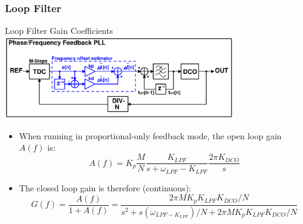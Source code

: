 \documentclass[t, screen, aspectratio=43]{beamer}
\begin{document}
\begin{frame}
	\frametitle{Loop Filter}
	\begin{block}{Loop Filter Gain Coefficients}
		\vspace{-0.5em}
		\center\includegraphics[width=0.75\textwidth, angle=0]{more_advanced.pdf}
		\begin{itemize}
			\footnotesize
			\item When running in proportional-only feedback mode, the open loop gain $A(f)$ is:
			\tiny
			\begin{equation}
				A(f) = K_p \frac{M}{N}\frac{K_{LPF}}{s + \omega_{LPF} - K_{LPF}}\frac{2\pi K_{DCO}}{s}
			\end{equation}
			\footnotesize
			\item The closed loop gain is therefore (continuous):
			\tiny
			\begin{equation}
				G(f) =  \frac{A(f)}{1+A(f)}= \frac{2\pi M K_pK_{LPF}K_{DCO}/N}{s^2+s(\omega_{LPF - K_{LPF}})/N + 2\pi M K_pK_{LPF}K_{DCO}/N}
			\end{equation}	
		\end{itemize} 	 
	\end{block}
\end{frame}
\end{document}
